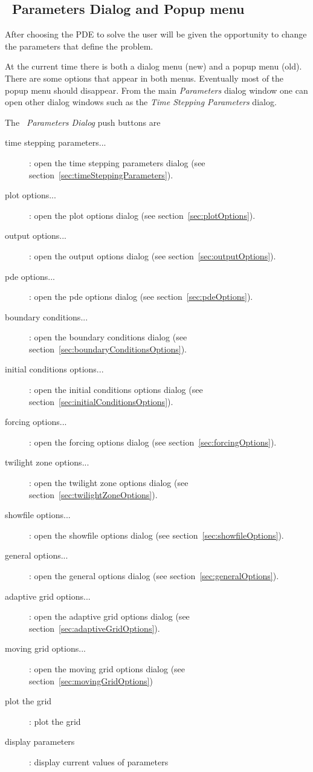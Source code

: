 \subsection{\Solver\ Parameters Dialog and Popup menu}\label{sec:parametersDialog}

After choosing the PDE to solve the user will be given the opportunity to
change the parameters that define the problem. 

At the current time there is both a dialog menu (new) and a popup menu (old). There are some options
that appear in both menus. Eventually most of the popup menu should disappear.
From the main {\em Parameters} dialog window one can open other dialog windows such
as the {\em Time Stepping Parameters} dialog. 


The {\em \Solver\ Parameters Dialog} push buttons are 
\begin{description}
  \item[\qquad time stepping parameters...] : open the time stepping parameters dialog 
                      (see section~\ref{sec:timeSteppingParameters}).
  \item[\qquad plot options...] : open the plot options dialog (see section~\ref{sec:plotOptions}).
  \item[\qquad output options...] : open the output options dialog (see section~\ref{sec:outputOptions}).
  \item[\qquad pde options...] : open the pde options dialog (see section~\ref{sec:pdeOptions}).
  \item[\qquad boundary conditions...] : open the boundary conditions dialog
            (see section~\ref{sec:boundaryConditionsOptions}).
  \item[\qquad initial conditions options...] : open the initial conditions options dialog
               (see section~\ref{sec:initialConditionsOptions}).
  \item[\qquad forcing options...] : open the forcing options dialog (see section~\ref{sec:forcingOptions}).
  \item[\qquad twilight zone options...] : open the twilight zone options dialog 
                 (see section~\ref{sec:twilightZoneOptions}).
  \item[\qquad showfile options...] : open the showfile options dialog (see section~\ref{sec:showfileOptions}).
  \item[\qquad general options...] : open the general options dialog (see section~\ref{sec:generalOptions}). 
  \item[\qquad adaptive grid options...] : open the adaptive grid options dialog
                 (see section~\ref{sec:adaptiveGridOptions}).
  \item[\qquad moving grid options...] : open the moving grid options dialog
                 (see section~\ref{sec:movingGridOptions})
  \item[\qquad plot the grid] : plot the grid
  \item[\qquad display parameters] : display current values of parameters 
\end{description}

